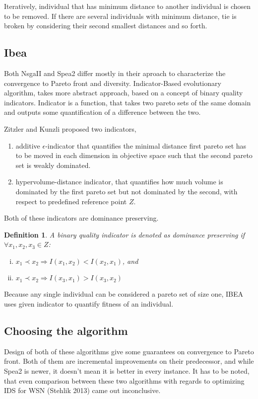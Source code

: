 \documentclass[12pt,oneside,draft]{fithesis2}
\newtheorem{defn}{Definition}
\begin{document}
Iteratively, individual that has minimum distance to another individual is chosen to be removed. If there are several individuals with minimum distance, tie is broken by considering their second smallest distances and so forth. 

\subsection{Ibea}
Both NsgaII and Spea2 differ mostly in their aproach to characterize the convergence to Pareto front and diversity. 
Indicator-Based evolutionary algorithm, takes more abstract approach, based on a concept of binary quality indicators.
Indicator is a function, that takes two pareto sets of the same domain and outputs some quantification of a difference between the two.

Zitzler and Kunzli proposed two indicators,
\begin{enumerate}
\item additive $\epsilon$-indicator that quantifies the minimal distance first pareto set has to be moved in each dimension in objective space such that the second pareto set is weakly dominated.

\item hypervolume-distance indicator, that quantifies how much volume is dominated by the first pareto set but not dominated by the second, with respect to predefined reference point $Z$.
\end{enumerate}

Both of these indicators are dominance preserving. 

\begin{defn}
A binary quality indicator is denoted as dominance preserving if $\forall x_1,x_2,x_3 \in Z$:
\begin{enumerate}[(i)]
\item  $x_1 \prec x_2 \Rightarrow I({x_1},{x_2}) < I({x_2},{x_1})$, and
\item $x_1 \prec x_2 \Rightarrow I({x_3},{x_1}) > I({x_3},{x_2})$
\end{enumerate}
\end{defn}
Because any single individual can be considered a pareto set of size one, IBEA uses given indicator to quantify fitness of an individual.



\subsection{Choosing the algorithm}
Design of both of these algorithms give some guarantees on convergence to Pareto front. Both of them are incremental improvements on their predecessor, and while Spea2 is newer, it doesn't mean it is better in every instance. It has to be noted, that even comparison between these two algorithms with regards to optimizing IDS for WSN (Stehlik 2013) came out inconclusive. 
\end{document}
